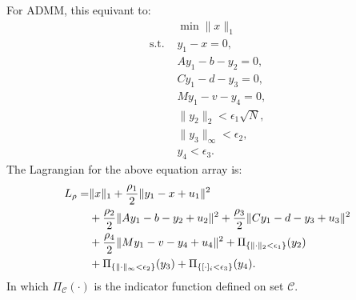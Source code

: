 \documentclass[review]{acmsiggraph}
\begin{document}
For ADMM, this equivant to:
\begin{align}
&\min\|x\|_1\\
\mbox{s.t. }&y_1-x=0,\\
&Ay_1-b-y_2=0,\\
&Cy_1-d-y_3=0,\\
&My_1-v-y_4=0,\\
&\|y_2\|_2<\epsilon_1\sqrt{N},\\
&\|y_3\|_{\infty}<\epsilon_2,\\
&y_4<\epsilon_3.
\end{align}
The Lagrangian for the above equation array is:
\begin{align}
L_\rho=&\|x\|_1+\frac{\rho_1}{2}\|y_1-x+u_1\|^2\notag\\
&+\frac{\rho_2}{2}\|Ay_1-b-y_2+u_2\|^2+\frac{\rho_3}{2}\|Cy_1-d-y_3+u_3\|^2\notag\\
&+\frac{\rho_4}{2}\|My_1-v-y_4+u_4\|^2+\Pi_{\{\|\cdot\|_2<\epsilon_1\}}(y_2)\notag\\
&+\Pi_{\{\|\cdot\|_{\infty}<\epsilon_2\}}(y_3)+\Pi_{\{[\cdot]_i<\epsilon_3\}}(y_4).
\end{align}
In which $\Pi_{\mathcal{C}}(\cdot)$ is the indicator function defined on set $\mathcal{C}$.
\end{document}
